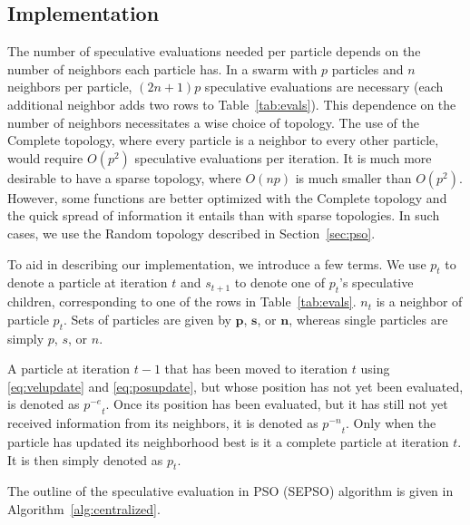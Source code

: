 \documentclass{llncs}
\renewcommand{\sec}[1]{Section~\ref{sec:#1}}
\newcommand{\alg}[1]{Algorithm~\ref{alg:#1}}
\providecommand{\noeval}[1]{\ensuremath{#1^{-e}}}
\providecommand{\nonbest}[1]{\ensuremath{#1^{-n}}}
\providecommand{\p}{\ensuremath{p}}
\providecommand{\pset}{\ensuremath{\mathbf{p}}}
\providecommand{\s}{\ensuremath{s}}
\providecommand{\sset}{\ensuremath{\mathbf{s}}}
\providecommand{\n}{\ensuremath{n}}
\providecommand{\nset}{\ensuremath{\mathbf{n}}}
\begin{document}
\subsection{Implementation}
\label{sec:implementation}

The number of speculative evaluations needed per particle depends on the number
of neighbors each particle has.  In a swarm with $p$ particles and $n$
neighbors per particle, $(2n+1)p$ speculative evaluations are necessary (each
additional neighbor adds two rows to Table~\ref{tab:evals}).  This dependence
on the number of neighbors necessitates a wise choice of topology.  The use of
the Complete topology, where every particle is a neighbor to every other
particle, would require $O(p^2)$ speculative evaluations per iteration.  It is
much more desirable to have a sparse topology, where $O(np)$ is much smaller
than $O(p^2)$.  However, some functions are better optimized with the Complete
topology and the quick spread of information it entails than with sparse
topologies.  In such cases, we use the Random topology described in \sec{pso}.

To aid in describing our implementation, we introduce a few terms. We use
$\p_t$ to denote a particle at iteration $t$ and $\s_{t+1}$ to denote one of
$\p_t$'s speculative children, corresponding to one of the rows in
Table~\ref{tab:evals}.  $\n_t$ is a neighbor of particle $\p_t$.  Sets of
particles are given by $\pset$, $\sset$, or $\nset$, whereas single particles
are simply $\p$, $\s$, or $\n$.

A particle at iteration $t-1$ that has been moved to iteration $t$ using
\eqref{eq:velupdate} and \eqref{eq:posupdate}, but whose position has not yet
been evaluated, is denoted as $\noeval{\p}_t$.  Once its position has been
evaluated, but it has still not yet received information from its neighbors, it
is denoted as $\nonbest{\p}_t$.  Only when the particle has updated its
neighborhood best is it a complete particle at iteration $t$.  It is then
simply denoted as $\p_t$.

The outline of the speculative evaluation in PSO (SEPSO) algorithm is given in
\alg{centralized}.
\end{document}
